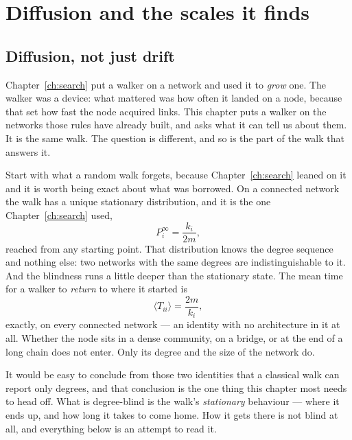\chapter{Diffusion and the scales it finds}
\label{ch:diffusion}

\section{Diffusion, not just drift}

Chapter~\ref{ch:search} put a walker on a network and used it to \emph{grow} one.
The walker was a device: what mattered was how often it landed on a node, because
that set how fast the node acquired links. This chapter puts a walker on the
networks those rules have already built, and asks what it can tell us about them.
It is the same walk. The question is different, and so is the part of the walk that
answers it.

Start with what a random walk forgets, because Chapter~\ref{ch:search} leaned on it
and it is worth being exact about what was borrowed. On a connected network the walk has a unique stationary
distribution, and it is the one Chapter~\ref{ch:search} used,
\begin{equation}
  P^\infty_i = \frac{k_i}{2m},
  \label{eq:hc-stationary}
\end{equation}
reached from any starting point. That distribution knows the degree sequence and
nothing else: two networks with the same degrees are indistinguishable to it. And
the blindness runs a little deeper than the stationary state. The mean time for a
walker to \emph{return} to where it started is
\begin{equation}
  \langle T_{ii}\rangle = \frac{2m}{k_i},
  \label{eq:hc-return}
\end{equation}
exactly, on every connected network \citep{noh2004} --- an identity with no
architecture in it at all. Whether the node sits in a dense community, on a bridge,
or at the end of a long chain does not enter. Only its degree and the size of the
network do.

It would be easy to conclude from those two identities that a classical walk can
report only degrees, and that conclusion is the one thing this chapter most needs to
head off. What is degree-blind is the walk's \emph{stationary} behaviour --- where it
ends up, and how long it takes to come home. How it gets there is not blind at all,
and everything below is an attempt to read it.


